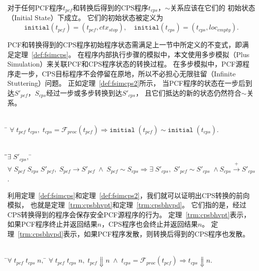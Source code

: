 对于任何PCF程序$t_{pcf}$和转换后得到的CPS程序$t_{cps}$，$\sim$关系应该在它们的
初始状态（Initial State）下成立。
它们的初始状态被定义为
\begin{equation}
\mathtt{initial}(t_{pcf}) = (t_{pcf}, ctx_{stop}),\quad
\mathtt{initial}(t_{cps}) = (t_{cps}, loc_{empty}).
\end{equation}

PCF和转换得到的CPS程序初始程序状态需满足上一节中所定义的不变式，即满足定理~\ref{def:fsimcps}。
在程序内部执行步骤的模拟中，本文使用多步模拟（Plus Simulation）来关联PCF和CPS程序状态的转换过程。
在多步模拟中，PCF源程序走一步，CPS目标程序不会停留在原地，所以不必担心无限驻留（Infinite Stuttering）问题。
正如定理~\ref{def:fsimcps2}所示，
当PCF程序的状态在一步后到达$S'_{pcf}$，$S_{cps}$经过一步或多步转换到达$S'_{cps}$，
且它们抵达的新的状态仍然符合$\sim$关系。

\begin{theorem}[CPS转换中初始状态的模拟]\label{def:fsimcps}
    \begin{tabbing}
      \\
    \quad\=\kill 
    \>$\forall\; t_{pcf} \; t_{cps},\;
       t_{cps}=\mathcal{F}_{proc}(t_{pcf})\Longrightarrow \mathtt{initial}\; (t_{pcf})
       \sim \mathtt{initial}\; (t_{cps}).$
    \end{tabbing}
\end{theorem}

\begin{theorem}[CPS转换中程序内部执行步骤的模拟]\label{def:fsimcps2}
    \begin{tabbing}
      \\
    \quad\=\qquad\=$\exists\; S'_{cps},\; $\=\kill
    \>$\forall \; S_{pcf}\; S_{cps}\; S'_{pcf},\; S_{pcf}\rightarrow S'_{pcf}\; \wedge \; S_{pcf}\sim S_{cps} \Longrightarrow \exists\; S'_{cps},\; S'_{pcf}\sim S'_{cps}\; \wedge
        S_{cps}\xrightarrow{+} S'_{cps}$.
    \end{tabbing}
\end{theorem}

利用定理~\ref{def:fsimcps}和定理~\ref{def:fsimcps2}，我们就可以证明出CPS转换的前向模拟，
也就是定理~\ref{trm:cpsbhvpt}和定理~\ref{trm:cpsbhvpd}。
它们指的是，经过CPS转换得到的程序会保存安全PCF源程序的行为。
定理~\ref{trm:cpsbhvpt}表示，如果PCF程序终止并返回结果$n$，CPS程序也会终止并返回结果$n$。
定理~\ref{trm:cpsbhvpd}表示，如果PCF程序发散，则转换后得到的CPS程序也发散。

\begin{theorem}[CPS程序对PCF程序终止行为的保存]\label{trm:cpsbhvpt} 
    \begin{tabbing}
     \\
    \quad\=$\forall \; t_{pcf}\; t_{cps}\; n,\; $\=\kill
    \>$\forall \; t_{pcf}\; t_{cps}\; n,\; t_{pcf}\Downarrow n\; \wedge \; t_{cps}=\mathcal{F}_{proc}(t_{pcf}) \Longrightarrow t_{cps}\Downarrow n.$
    \end{tabbing}
  \end{theorem}
  
